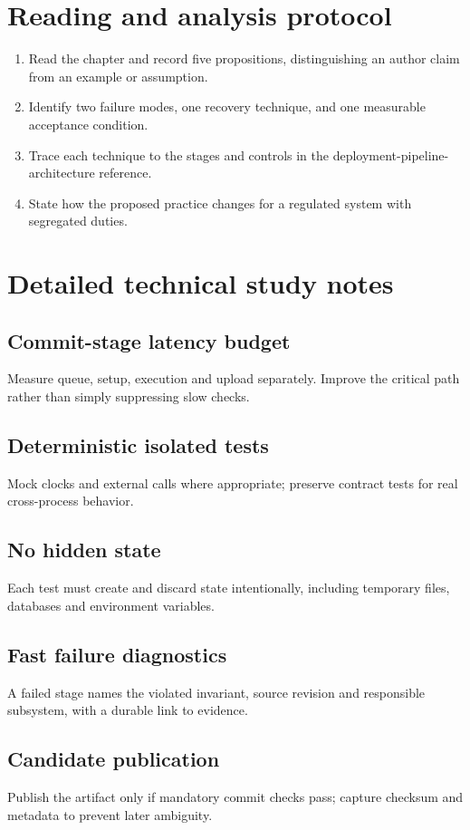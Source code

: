 \documentclass[10pt,letterpaper]{article}
\begin{document}
\section{Reading and analysis protocol}
\begin{enumerate}
\item Read the chapter and record five propositions, distinguishing an author claim from an example or assumption.
\item Identify two failure modes, one recovery technique, and one measurable acceptance condition.
\item Trace each technique to the stages and controls in the deployment-pipeline-architecture reference.
\item State how the proposed practice changes for a regulated system with segregated duties.
\end{enumerate}

\section{Detailed technical study notes}
\subsection{Commit-stage latency budget}
Measure queue, setup, execution and upload separately. Improve the critical path rather than simply suppressing slow checks.

\subsection{Deterministic isolated tests}
Mock clocks and external calls where appropriate; preserve contract tests for real cross-process behavior.

\subsection{No hidden state}
Each test must create and discard state intentionally, including temporary files, databases and environment variables.

\subsection{Fast failure diagnostics}
A failed stage names the violated invariant, source revision and responsible subsystem, with a durable link to evidence.

\subsection{Candidate publication}
Publish the artifact only if mandatory commit checks pass; capture checksum and metadata to prevent later ambiguity.
\end{document}
